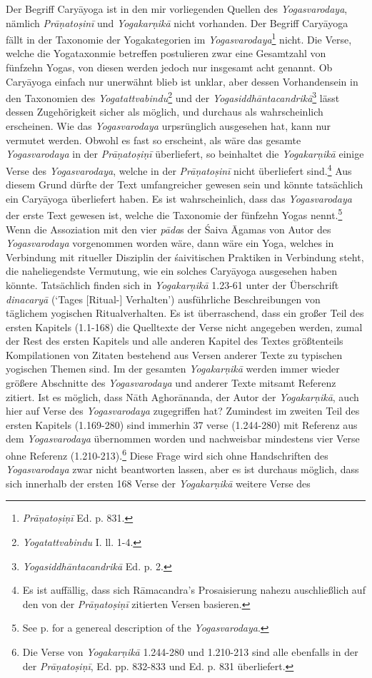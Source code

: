 Der Begriff Caryāyoga ist in den mir vorliegenden Quellen des \textit{Yogasvarodaya}, nämlich \textit{Prāṇatoṣinī} und \textit{Yogakarṇikā} nicht vorhanden. Der Begriff Caryāyoga fällt in der Taxonomie der Yogakategorien im \textit{Yogasvarodaya}\footnote{\textit{Prāṇatoṣiṇī} Ed. p. 831.} nicht. Die Verse, welche die Yogataxonmie betreffen postulieren zwar eine Gesamtzahl von fünfzehn Yogas, von diesen werden jedoch nur insgesamt acht genannt. Ob Caryāyoga einfach nur unerwähnt blieb ist unklar, aber dessen Vorhandensein in den Taxonomien des \textit{Yogatattvabindu}\footnote{\textit{Yogatattvabindu} I. ll. 1-4.} und der \textit{Yogasiddhāntacandrikā}\footnote{\textit{Yogasiddhāntacandrikā} Ed. p. 2.} lässt dessen Zugehörigkeit sicher als möglich, und durchaus als wahrscheinlich erscheinen. Wie das \textit{Yogasvarodaya} urpsrünglich ausgesehen hat, kann nur vermutet werden. Obwohl es fast so erscheint, als wäre das gesamte \textit{Yogasvarodaya} in der \textit{Prāṇatoṣiṇī} überliefert, so beinhaltet die \textit{Yogakarṇikā} einige Verse des \textit{Yogasvarodaya}, welche in der \textit{Prāṇatoṣinī} nicht überliefert sind.\footnote{Es ist auffällig, dass sich Rāmacandra's Prosaisierung nahezu auschließlich auf den von der \textit{Prāṇatoṣiṇī} zitierten Versen basieren.} Aus diesem Grund dürfte der Text umfangreicher gewesen sein und könnte tatsächlich ein Caryāyoga überliefert haben. Es ist wahrscheinlich, dass das \textit{Yogasvarodaya} der erste Text gewesen ist, welche die Taxonomie der fünfzehn Yogas nennt.\footnote{See p.\pageref{???} for a genereal description of the \textit{Yogasvarodaya}.} Wenn die Assoziation mit den vier \textit{pāda}s der Śaiva Āgamas von Autor des \textit{Yogasvarodaya} vorgenommen worden wäre, dann wäre ein Yoga, welches in Verbindung mit ritueller Disziplin der śaivitischen Praktiken in Verbindung steht, die naheliegendste Vermutung, wie ein solches Caryāyoga ausgesehen haben könnte. Tatsächlich finden sich in \textit{Yogakarṇikā} 1.23-61 unter der Überschrift \textit{dinacaryā} (`Tages [Ritual-] Verhalten') ausführliche Beschreibungen von täglichem yogischen Ritualverhalten. Es ist überraschend, dass ein großer Teil des ersten Kapitels (1.1-168) die Quelltexte der Verse nicht angegeben werden, zumal der Rest des ersten Kapitels und alle anderen Kapitel des Textes größtenteils Kompilationen von Zitaten bestehend aus Versen anderer Texte zu typischen yogischen Themen sind. Im der gesamten \textit{Yogakarṇikā} werden immer wieder größere Abschnitte des \textit{Yogasvarodaya} und anderer Texte mitsamt Referenz zitiert. Ist es möglich, dass Nāth Aghorānanda, der Autor der \textit{Yogakarṇikā}, auch hier auf Verse des \textit{Yogasvarodaya} zugegriffen hat? Zumindest im zweiten Teil des ersten Kapitels (1.169-280) sind immerhin 37 verse (1.244-280) mit Referenz aus dem \textit{Yogasvarodaya} übernommen worden und nachweisbar mindestens vier Verse ohne Referenz (1.210-213).\footnote{Die Verse von \textit{Yogakarṇikā} 1.244-280 und 1.210-213 sind alle ebenfalls in der der \textit{Prāṇatoṣiṇī}, Ed. pp. 832-833 und Ed. p. 831 überliefert.} Diese Frage wird sich ohne Handschriften des \textit{Yogasvarodaya} zwar nicht beantworten lassen, aber es ist durchaus möglich, dass sich innerhalb der ersten 168 Verse der \textit{Yogakarṇikā} weitere Verse des 